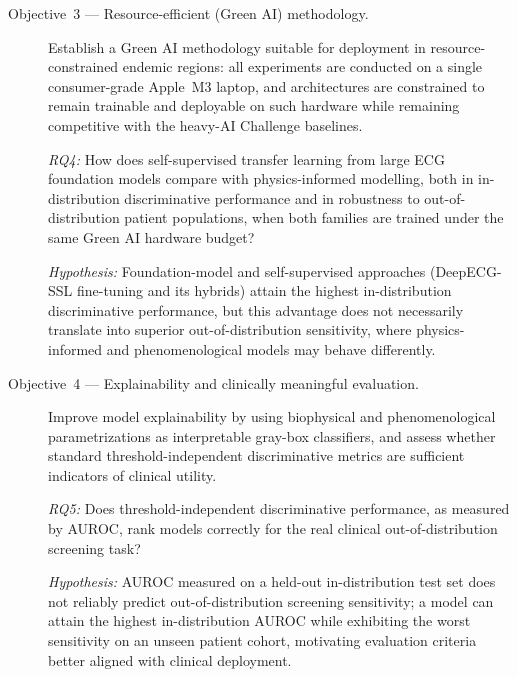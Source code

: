 \begin{description}
    \item[Objective~3 --- Resource-efficient (Green AI) methodology.]
    Establish a Green AI methodology suitable for deployment in resource-constrained endemic regions: all experiments are conducted on a single consumer-grade Apple~M3 laptop, and architectures are constrained to remain trainable and deployable on such hardware while remaining competitive with the heavy-AI Challenge baselines.

    \textit{RQ4:} How does self-supervised transfer learning from large ECG foundation models compare with physics-informed modelling, both in in-distribution discriminative performance and in robustness to out-of-distribution patient populations, when both families are trained under the same Green AI hardware budget?

    \textit{Hypothesis:} Foundation-model and self-supervised approaches (DeepECG-SSL fine-tuning and its hybrids) attain the highest in-distribution discriminative performance, but this advantage does not necessarily translate into superior out-of-distribution sensitivity, where physics-informed and phenomenological models may behave differently.

    \item[Objective~4 --- Explainability and clinically meaningful evaluation.]
    Improve model explainability by using biophysical and phenomenological parametrizations as interpretable gray-box classifiers, and assess whether standard threshold-independent discriminative metrics are sufficient indicators of clinical utility.

    \textit{RQ5:} Does threshold-independent discriminative performance, as measured by AUROC, rank models correctly for the real clinical out-of-distribution screening task?

    \textit{Hypothesis:} AUROC measured on a held-out in-distribution test set does not reliably predict out-of-distribution screening sensitivity; a model can attain the highest in-distribution AUROC while exhibiting the worst sensitivity on an unseen patient cohort, motivating evaluation criteria better aligned with clinical deployment.
\end{description}
